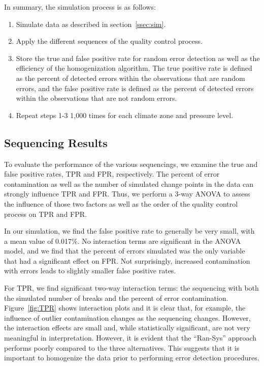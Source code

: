 \documentclass[12pt]{article}
\begin{document}
\begin{doublespacing}
In summary, the simulation process is as follows:

\begin{enumerate}
	\item Simulate data as described in section~\ref{ssec:sim}.
	\item Apply the different sequences of the quality control process.
	\item Store the true and false positive rate for random error detection as well as the efficiency of the homogenization algorithm.  The true positive rate is defined as the percent of detected errors within the observations that are random errors, and the false positive rate is defined as the percent of detected errors within the observations that are not random errors.
	\item Repeat steps 1-3 1,000 times for each climate zone and pressure level.
\end{enumerate}

\subsection{Sequencing Results}

To evaluate the performance of the various sequencings, we examine the true and false positive rates, TPR and FPR, respectively.  The percent of error contamination as well as the number of simulated change points in the data can strongly influence TPR and FPR.  Thus, we perform a 3-way ANOVA to assess the influence of those two factors as well as the order of the quality control process on TPR and FPR.

In our simulation, we find the false positive rate to generally be very small, with a mean value of 0.017\%.  No interaction terms are significant in the ANOVA model, and we find that the percent of errors simulated was the only variable that had a significant effect on FPR.  Not surprisingly, increased contamination with errors leads to slightly smaller false positive rates.

For TPR, we find significant two-way interaction terms: the sequencing with both the simulated number of breaks and the percent of error contamination.  Figure~\ref{fig:TPR} shows interaction plots and it is clear that, for example, the influence of outlier contamination changes as the sequencing changes.  However, the interaction effects are small and, while statistically significant, are not very meaningful in interpretation.  However, it is evident that the ``Ran-Sys'' approach performs poorly compared to the three alternatives.  This suggests that it is important to homogenize the data prior to performing error detection procedures.


\end{doublespacing}
\end{document}
